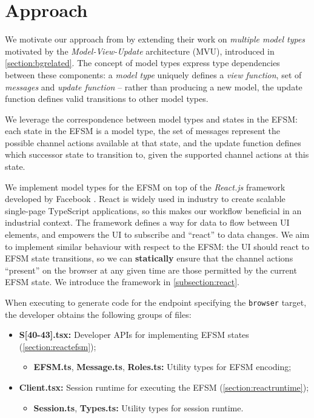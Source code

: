 \section{Approach}
We motivate our approach from \cite{MVU2020} by extending
their work on \textit{multiple model types} motivated by the
\textit{Model-View-Update} architecture (MVU),
introduced in \cref{section:bgrelated}.
The concept of model types express type dependencies between these
components: a \emph{model type} uniquely defines a \textit{view function},
set of \textit{messages} and \textit{update function} -- rather than
producing a new model, the update function defines valid transitions to
other model types.

We leverage the correspondence between model types 
and states in the EFSM:
each state in the EFSM is a model type, the set of messages represent
the possible channel actions available at that state,
and the update function defines which successor state to transition to,
given the supported channel actions at this state.

We implement model types for the EFSM on top of the 
\emph{React.js} framework developed by Facebook \cite{React}.
React is widely used in industry to create scalable single-page
TypeScript applications, so this makes our workflow beneficial in an
industrial context. 
The framework defines a way for data to flow
between UI elements, and empowers the UI to subscribe and
``react'' to data changes.
We aim to implement similar behaviour with respect to the EFSM:
the UI should react to EFSM state transitions,
so we can \textbf{statically} ensure that the
channel actions ``present'' on the browser at any given time
are those permitted by the current EFSM state.
We introduce the framework in \cref{subsection:react}.

When executing  to generate code
for the  endpoint specifying the
\texttt{browser} target, the developer obtains the following 
groups of files:

\begin{itemize}

\item 
\textbf{S[40-43].tsx:}
Developer APIs for implementing EFSM states 
(\cref{section:reactefsm});

\begin{itemize}
\item
\textbf{EFSM.ts}, \textbf{Message.ts}, \textbf{Roles.ts:}
Utility types for EFSM encoding;
\end{itemize}

\item 
\textbf{Client.tsx:} 
Session runtime for executing the EFSM 
(\cref{section:reactruntime});

\begin{itemize}
\item
\textbf{Session.ts}, \textbf{Types.ts:}
Utility types for session runtime.
\end{itemize}

\end{itemize}

